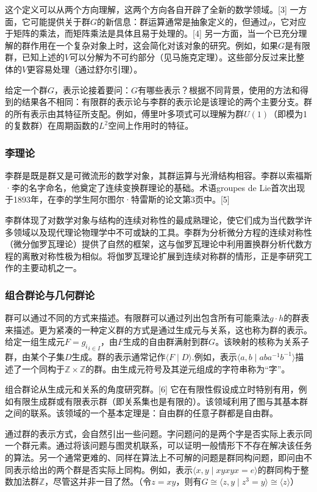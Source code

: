 这个定义可以从两个方向理解，这两个方向各自开辟了全新的数学领域。[3] 一方面，它可能提供关于群$G$的新信息：群运算通常是抽象定义的，但通过$\rho$，它对应于矩阵的乘法，而矩阵乘法是具体且易于处理的。[4] 另一方面，当一个已充分理解的群作用在一个复杂对象上时，这会简化对该对象的研究。例如，如果$G$是有限群，已知上述的$V$可以分解为不可约部分（见马施克定理）。这些部分反过来比整体的$V$更容易处理（通过舒尔引理）。

给定一个群$G$，表示论接着要问：$G$有哪些表示？根据不同背景，使用的方法和得到的结果各不相同：有限群的表示论与李群的表示论是该理论的两个主要分支。群的所有表示由其特征所支配。例如，傅里叶多项式可以理解为群$U(1)$（即模为1的复数群）在周期函数的$L^2$空间上作用时的特征。
\subsubsection{李理论}
李群是既是群又是可微流形的数学对象，其群运算与光滑结构相容。李群以索福斯·李的名字命名，他奠定了连续变换群理论的基础。术语groupes de Lie首次出现于1893年，在李的学生阿尔图尔·特雷斯的论文第3页中。[5]

李群体现了对数学对象与结构的连续对称性的最成熟理论，使它们成为当代数学许多领域以及现代理论物理学中不可或缺的工具。李群为分析微分方程的连续对称性（微分伽罗瓦理论）提供了自然的框架，这与伽罗瓦理论中利用置换群分析代数方程的离散对称性极为相似。将伽罗瓦理论扩展到连续对称群的情形，正是李研究工作的主要动机之一。
\subsubsection{组合群论与几何群论}
群可以通过不同的方式来描述。有限群可以通过列出包含所有可能乘法$g \cdot h$的群表来描述。更为紧凑的一种定义群的方式是通过生成元与关系，这也称为群的表示。给定一组生成元$F = { g_i }_{i \in I}$，由$F$生成的自由群满射到群$G$。该映射的核称为关系子群，由某个子集$D$生成。群的表示通常记作$\langle F \mid D \rangle $.例如，表示$\langle a, b \mid aba^{-1}b^{-1} \rangle$描述了一个同构于$\mathbb{Z} \times \mathbb{Z}$的群。由生成元符号及其逆元组成的字符串称为“字”。

组合群论从生成元和关系的角度研究群。[6] 它在有限性假设成立时特别有用，例如有限生成群或有限表示群（即关系集也是有限的）。该领域利用了图与其基本群之间的联系。该领域的一个基本定理是：自由群的任意子群都是自由群。

通过群的表示方式，会自然引出一些问题。字问题问的是两个字是否实际上表示同一个群元素。通过将该问题与图灵机联系，可以证明一般情形下不存在解决该任务的算法。另一个通常更难的、同样在算法上不可解的问题是群同构问题，即问由不同表示给出的两个群是否实际上同构。例如，表示$\langle x, y \mid xyxyx = e \rangle$的群同构于整数加法群$\mathbb{Z}$，尽管这并非一目了然。（令$z = xy$，则有$
G \cong \langle z, y \mid z^3 = y \rangle \cong \langle z \rangle $）
